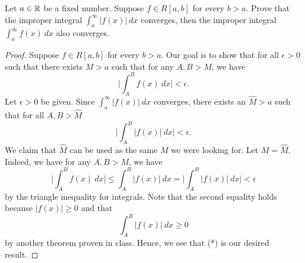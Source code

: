 \documentclass[a4paper]{article}
\begin{document}
\begin{problem}
    Let \( a \in \mathbb{R}  \) be a fixed number. Suppose \( f \in R[a,b] \) for every \(  b > a  \). Prove that the improper integral \( \int_{ a }^{ \infty  }  | f(x) |  \ dx   \) converges, then the improper integral \( \int_{ a }^{ \infty  }  f(x) \ dx   \) also converges. 
\end{problem}
\begin{proof}
    Suppose \( f \in R[a,b] \) for every \( b > a   \). Our goal is to show that for all \( \epsilon > 0  \) such that there exists \(  M > a  \) such that for any \( A,B > M  \), we have 
    \[  \Big| \int_{ A }^{ B } f(x) \ dx  \Big|  < \epsilon. \]
    Let \( \epsilon > 0  \) be given. Since \( \int_{ a }^{ \infty  } | f(x) |  \ dx   \) converges, there exists an \( \hat{M} > a  \)  such that for all \( A , B > \hat{M} \) 
    \[  \Big| \int_{ A }^{ B } | f(x) |  \ dx  \Big|  < \epsilon.  \]
    We claim that \( \hat{M} \) can be used as the same \( M  \) we were looking for. Let \( M = \hat{M} \). Indeed, we have for any \( A,B > M  \), we have  
    \[  \Big| \int_{ A }^{ B } f(x) \ dx  \Big| \leq \int_{ A }^{ B } | f(x) |  \ dx = \Big| \int_{ A }^{ B } | f(x) |  \ dx   \Big|  < \epsilon \tag{*} \]
    by the triangle inequality for integrals. Note that the second equality holds because \( | f(x) |  \geq 0  \) and that 
    \[  \int_{ A }^{ B } | f(x) |  \ dx \geq 0  \]
    by another theorem proven in class. Hence, we see that (*) is our desired result.
\end{proof}
\end{document}
